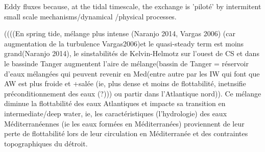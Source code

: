 Eddy fluxes because, at the tidal timescale, the exchange is 'piloté' by intermitent small scale mechanisms/dynamical /physical processes.







((((En spring tide, mélange plus intense (Naranjo 2014, Vargas 2006) (car augmentation de la turbulence Vargas2006)et le quasi-steady term est moins grand(Naranjo 2014), le sinstabilités de Kelvin-Helmotz sur l’ouest de CS et dans le bassinde Tanger augmentent l’aire de mélange(bassin de Tanger = réservoir d’eaux mélangées qui peuvent revenir en Med(entre autre par les IW qui font que AW est plus froide et +salée (ie, plus dense et moins de flottabilité, inetnsifie préconditionnement des eaux (?))) ou partir dans l’Atlantique nord)). Ce mélange diminue la flottabilité des eaux Atlantiques et impacte sa transition en intermediate/deep water, ie, les caractéristiques (l’hydrologie) des eaux Méditerranéennes (ie les eaux formées en Méditerranées) proviennent de leur perte de flottabilité lors de leur circulation en Méditerranée et des contraintes topographiques du détroit.











